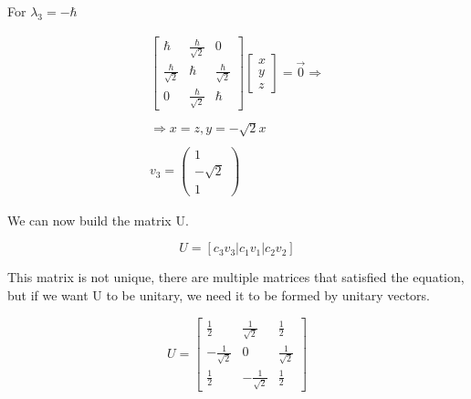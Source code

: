 For $\lambda_3= -\hbar$

\begin{equation}
  \begin{array}{c}
    \left[\begin{matrix}
      \hbar & \frac{\hbar}{\sqrt{2}} & 0\\
      \frac{\hbar}{\sqrt{2}} & \hbar & \frac{\hbar}{\sqrt{2}}\\
      0 & \frac{\hbar}{\sqrt{2}} & \hbar
    \end{matrix}\right]
    \left[\begin{matrix}
      x\\
      y\\
      z
    \end{matrix}\right] = \vec{0} \Rightarrow
    \\

    \\
    \Rightarrow x = z, y = -\sqrt{2}x
    \\

    \\
    v_3 = \left(\begin{matrix}
      1\\
      -\sqrt{2}\\
      1
    \end{matrix}\right)
  \end{array}
\end{equation}

We can now build the matrix U.

\begin{equation}
  U=[c_3 v_3 | c_1 v_1 | c_2 v_2]
\end{equation}


This matrix is not unique, there are multiple matrices that satisfied the equation, but if we want U to be unitary, we need it to be formed by unitary vectors.

\begin{equation}
  U = \left[\begin{matrix}
    \frac{1}{2} & \frac{1}{\sqrt{2}} & \frac{1}{2}\\
    -\frac{1}{\sqrt{2}} & 0 & \frac{1}{\sqrt{2}}\\
    \frac{1}{2} & -\frac{1}{\sqrt{2}} & \frac{1}{2}
  \end{matrix}\right]
\end{equation}



